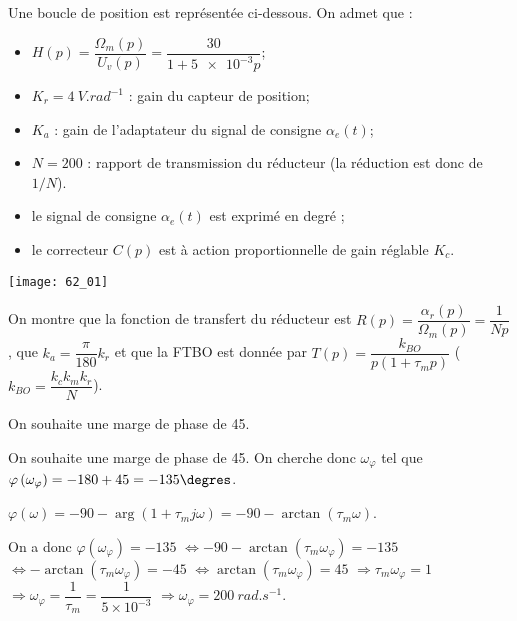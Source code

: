 \normaltrue \difficilefalse \tdifficilefalse
\correctiontrue

\setcounter{question}{0}%

\ifcorrection
\else
{}
\fi


\ifprof 
\else
Une boucle de position est représentée ci-dessous. On admet que :  
\begin{itemize}
\item $H(p)=\dfrac{\Omega_m(p)}{U_v(p)}=\dfrac{30}{1+\num{5e-3}p}$;
\item $K_r = \SI{4}{V.rad^{-1}}$ : gain du capteur de position;
\item $K_a$ : gain de l’adaptateur du signal de consigne $\alpha_e(t)$; 
\item $N=200$ : rapport de transmission du réducteur (la réduction est donc de $1/N$).
\item le signal de consigne $\alpha_e(t)$ est exprimé en degré ; 
\item le correcteur $C(p)$ est à action proportionnelle de gain réglable $K_c$. 
\end{itemize}


\begin{center}
\texttt{[image: 62\_01]}
\end{center}
 \fi
 
 
 On montre que la fonction de transfert du réducteur est $R(p)=\dfrac{\alpha_r(p)}{\Omega_m(p)}=\dfrac{1}{Np}$, que  $k_a=\dfrac{\pi}{180}k_r$ et que la FTBO est donnée par $T(p)=\dfrac{k_{BO}}{p\left(1+\tau_m p\right)}$ ($k_{BO}=\dfrac{k_c k_m k_r}{N}$).
 
 
 On souhaite une marge de phase de 45\degres.
 
\ifprof
On souhaite une marge de phase de 45\degres. On cherche donc $\omega_{\varphi}$ tel que 
$\varphi\left(\omega_{\varphi}\right)=-180+45 = -135\degres$.

$\varphi(\omega)=-90-\arg\left(1+\tau_m j \omega \right) =-90-\arctan\left(\tau_m  \omega \right)  $.

On a donc $\varphi\left(\omega_{\varphi}\right)=-135$
$\Leftrightarrow -90-\arctan\left(\tau_m  \omega_{\varphi}\right)  = -135 $
$\Leftrightarrow -\arctan\left(\tau_m  \omega_{\varphi} \right)  = -45 $
$\Leftrightarrow \arctan\left(\tau_m  \omega_{\varphi} \right)  = 45 $
$\Rightarrow \tau_m  \omega_{\varphi} = 1 $
$\Rightarrow \omega_{\varphi}  = \dfrac{1}{\tau_m}= \dfrac{1}{5\times 10^{-3}}$
$\Rightarrow \omega_{\varphi}  = \SI{200}{rad.s^{-1}}$.


